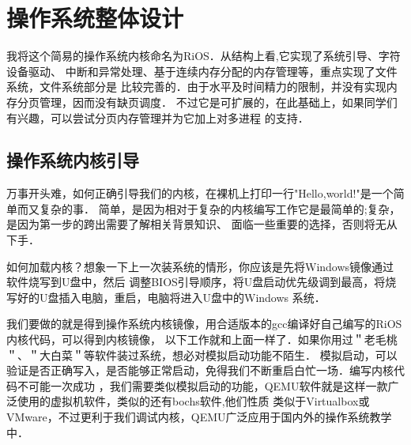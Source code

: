 \chapter{操作系统整体设计} 
我将这个简易的操作系统内核命名为RiOS．从结构上看,它实现了系统引导、字符设备驱动、
中断和异常处理、基于连续内存分配的内存管理等，重点实现了文件系统，文件系统部分是
比较完善的．由于水平及时间精力的限制，并没有实现内存分页管理，因而没有缺页调度．
不过它是可扩展的，在此基础上，如果同学们有兴趣，可以尝试分页内存管理并为它加上对多进程
的支持．

\section{操作系统内核引导}
万事开头难，如何正确引导我们的内核，在裸机上打印一行"Hello,world!"是一个简单而又复杂的事．
简单，是因为相对于复杂的内核编写工作它是最简单的;复杂，是因为第一步的跨出需要了解相关背景知识、
面临一些重要的选择，否则将无从下手．

如何加载内核？想象一下上一次装系统的情形，你应该是先将Windows镜像通过软件烧写到U盘中，然后
调整BIOS引导顺序，将U盘启动优先级调到最高，将烧写好的U盘插入电脑，重启，电脑将进入U盘中的Windows
系统．

我们要做的就是得到操作系统内核镜像，用合适版本的gcc编译好自己编写的RiOS内核代码，可以得到内核镜像，
以下工作就和上面一样了．如果你用过＂老毛桃＂、＂大白菜＂等软件装过系统，想必对模拟启动功能不陌生．
模拟启动，可以验证是否正确写入，是否能够正常启动，免得我们不断重启白忙一场．编写内核代码不可能一次成功
，我们需要类似模拟启动的功能，QEMU软件就是这样一款广泛使用的虚拟机软件，类似的还有bochs软件,他们性质
类似于Virtualbox或VMware，不过更利于我们调试内核，QEMU广泛应用于国内外的操作系统教学中．

